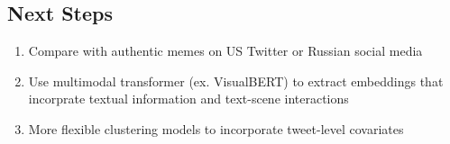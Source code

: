 \documentclass[article,36pt,extrafontsizes,oneside,openany,oldfontcommands]{memoir}
\begin{document}
\begin{adjmulticols*}{3}{0.5in}{0.5in}
\section{Next Steps}
\begin{adjustwidth}{0.1in}{0in}
\begin{enumerate}[topsep=0pt,itemsep=0ex,partopsep=0ex,parsep=0ex]
\item Compare with authentic memes on US Twitter or Russian social media
\item Use multimodal transformer (ex. VisualBERT) to extract embeddings that incorprate textual information and text-scene interactions
\item More flexible clustering models to incorporate tweet-level covariates
\end{enumerate} 
\end{adjustwidth}



\printbibliography[heading=none]


\end{adjmulticols*}
\end{document}
